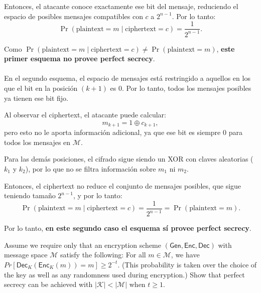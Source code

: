 \documentclass[12pt,addpoints,answers]{exam}
\begin{document}
\begin{questions}
\begin{solution}
    Entonces, el atacante conoce exactamente ese bit del mensaje, reduciendo el espacio de posibles mensajes compatibles con $c$ a $2^{n-1}$. Por lo tanto:
    \[
        \Pr(\text{plaintext} = m \mid \text{ciphertext} = c) = \frac{1}{2^{n-1}}.
    \]

    Como $\Pr(\text{plaintext} = m \mid \text{ciphertext} = c) \neq \Pr(\text{plaintext} = m)$, \textbf{este primer esquema no provee perfect secrecy}. \\ \\ 
    En el segundo esquema, el espacio de mensajes está restringido a aquellos en los que el bit en la posición $(k+1)$ es $0$. Por lo tanto, todos los mensajes posibles ya tienen ese bit fijo.

    Al observar el ciphertext, el atacante puede calcular:
    \[
        m_{k+1} = 1 \oplus c_{k+1},
    \]
    pero esto no le aporta información adicional, ya que ese bit es siempre $0$ para todos los mensajes en $\mathcal{M}$.

    Para las demás posiciones, el cifrado sigue siendo un XOR con claves aleatorias ($k_1$ y $k_2$), por lo que no se filtra información sobre $m_1$ ni $m_2$.

    Entonces, el ciphertext no reduce el conjunto de mensajes posibles, que sigue teniendo tamaño $2^{n-1}$, y por lo tanto:
    \[
        \Pr(\text{plaintext} = m \mid \text{ciphertext} = c) = \frac{1}{2^{n-1}} = \Pr(\text{plaintext} = m).
    \]

    Por lo tanto, \textbf{en este segundo caso el esquema sí provee perfect secrecy}.
\end{solution}


\question [10] Assume we require only that an encryption scheme $(\mathsf{Gen}, \mathsf{Enc},\mathsf{Dec})$ with message space $\mathcal{M}$ satisfy the following: For all $m \in \mathcal{M}$, we have $Pr[\mathsf{Dec}_K(\mathsf{Enc}_K(m)) = m] \geq 2^{-t}$. (This probability is taken over the choice of the key as well as any randomness used during encryption.) Show that perfect secrecy can be achieved with $|\mathcal{K}| < |\mathcal{M}|$ when $t\geq 1$. 


\end{questions}
\end{document}
